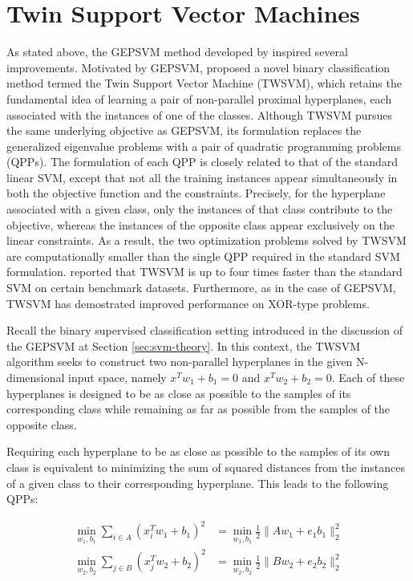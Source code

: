 \documentclass[12pt]{report} %
\begin{document}
\section{Twin Support Vector Machines} \label{sec:twsvm}

As stated above, the GEPSVM method developed by \cite{mangasarian2006multisurface} inspired several improvements. Motivated by GEPSVM, \cite{khemchandani2007twin} proposed a novel binary classification method termed the Twin Support Vector Machine (TWSVM), which retains the fundamental idea of learning a pair of non-parallel proximal hyperplanes, each associated with the instances of one of the classes. Although TWSVM pursues the same underlying objective as GEPSVM, its formulation replaces the generalized eigenvalue problems with a pair of quadratic programming problems (QPPs). The formulation of each QPP is closely related to that of the standard linear SVM, except that not all the training instances appear simultaneously in both the objective function and the constraints. Precisely, for the hyperplane associated with a given class, only the instances of that class contribute to the objective, whereas the instances of the opposite class appear exclusively on the linear constraints. As a result, the two optimization problems solved by TWSVM are computationally smaller than the single QPP required in the standard SVM formulation. \cite{khemchandani2007twin} reported that TWSVM is up to four times faster than the standard SVM on certain benchmark datasets. Furthermore, as in the case of GEPSVM, TWSVM has demostrated improved performance on XOR-type problems.

Recall the binary supervised classification setting introduced in the discussion of the GEPSVM at Section \ref{sec:svm-theory}. In this context, the TWSVM algorithm seeks to construct two non-parallel hyperplanes in the given N-dimensional input space, namely $x^Tw_1+b_1 = 0$ and $x^Tw_2+b_2 = 0$. Each of these hyperplanes is designed to be as close as possible to the samples of its corresponding class while remaining as far as possible from the samples of the opposite class.

Requiring each hyperplane to be as close as possible to the samples of its own class is equivalent to minimizing the sum of squared distances from the instances of a given class to their corresponding hyperplane. This leads to the following QPPs:

\begin{subequations}
\begin{align}
\min_{w_1,b_1} \sum_{i \in A} (x_i^T w_1 + b_1)^2 
&= \min_{w_1,b_1} \frac{1}{2}\|Aw_1 + e_1 b_1\|_2^2 \\
\min_{w_2,b_2} \sum_{j \in B} (x_j^T w_2 + b_2)^2 
&= \min_{w_2,b_2} \frac{1}{2}\|Bw_2 + e_2 b_2\|_2^2
\label{eq:twsvm_ls}
\end{align}
\end{subequations}
\end{document}
